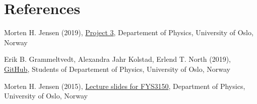 \documentclass{article}
\begin{document}

\vspace{1cm}

\section{References} \label{sec:References}

\begin{thebibliography}{}

Morten H. Jensen (2019), \href{https://github.com/CompPhysics/ComputationalPhysics/blob/master/doc/Projects/2019/Project3/pdf/Project3.pdf}{Project 3}, Departement of Physics, University of Oslo, Norway

Erik B. Grammeltvedt, Alexandra Jahr Kolstad, Erlend T. North (2019), \href{https://github.com/Erikbgram/Fys3150}{GitHub}, Students of Departement of Physics, University of Oslo, Norway

Morten H. Jensen (2015), \href{https://github.com/CompPhysics/ComputationalPhysics/blob/master/doc/Lectures/lectures2015.pdf}{Lecture slides for FYS3150}, Department of Physics, University of Oslo, Norway

\end{thebibliography}




\end{document}
